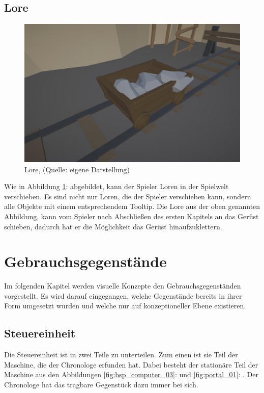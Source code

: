 \subsection{Lore}

\begin{figure}[ht]
\centering
\includegraphics[width=0.6\linewidth]{content/pictures/Lore.jpg}
\caption{Lore, (Quelle: eigene Darstellung)}
\label{fig:lore}
\end{figure}

Wie in Abbildung \ref{fig:lore}:  abgebildet, kann der Spieler Loren in der Spielwelt verschieben. Es sind nicht nur Loren, die der Spieler verschieben kann, sondern alle Objekte mit einem entsprechendem Tooltip. Die Lore aus der oben genannten Abbildung, kann vom Spieler nach Abschließen des ersten Kapitels an das Gerüst schieben, dadurch hat er die Möglichkeit das Gerüst hinaufzuklettern.

\section{Gebrauchsgegenstände}
Im folgenden Kapitel werden visuelle Konzepte den Gebrauchsgegenständen vorgestellt. Es wird darauf eingegangen, welche Gegenstände bereits in ihrer Form umgesetzt wurden und welche nur auf konzeptioneller Ebene existieren.

\subsection{Steuereinheit}
Die Steuereinheit ist in zwei Teile zu unterteilen. Zum einen ist sie Teil der Maschine, die der Chronologe erfunden hat. Dabei besteht der stationäre Teil der Maschine aus den Abbildungen \ref{fig:bsp_computer_03}:  und \ref{fig:portal_01}: . Der Chronologe hat das tragbare Gegenstück dazu immer bei sich.

